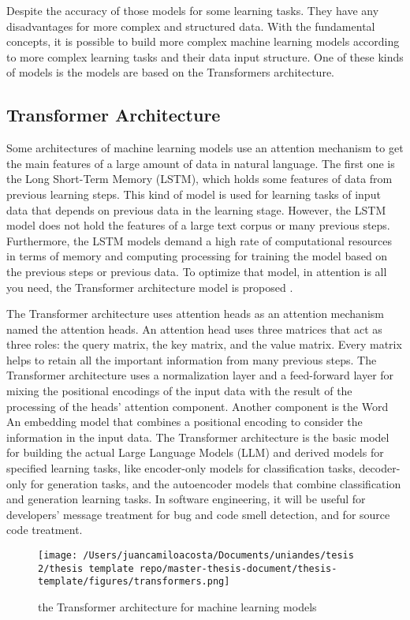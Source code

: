 Despite the accuracy of those models for some learning tasks. They have any disadvantages for more complex and structured data. With the fundamental concepts, it is possible to build more complex machine learning models according to more complex learning tasks and their data input structure. One of these kinds of models is the models are based on the Transformers architecture.

\subsection{Transformer Architecture}
Some architectures of machine learning models use an attention mechanism to get the main features of a large amount of data in natural language. The first one is the Long Short-Term Memory (LSTM), which holds some features of data from previous learning steps. This kind of model is used for learning tasks of input data that depends on previous data in the learning stage. However, the LSTM model does not hold the features of a large text corpus or many previous steps. Furthermore, the LSTM models demand a high rate of computational resources in terms of memory and computing processing for training the model based on the previous steps or previous data. To optimize that model, in attention is all you need, the Transformer architecture model is proposed \cite{attention_is_all_you_need}.

The Transformer architecture uses attention heads as an attention mechanism named the attention heads. An attention head uses three matrices that act as three roles: the query matrix, the key matrix, and the value matrix. Every matrix helps to retain all the important information from many previous steps. The Transformer architecture uses a normalization layer and a feed-forward layer for mixing the positional encodings of the input data with the result of the processing of the heads' attention component. Another component is the Word 
An embedding model that combines a positional encoding to consider the information in the input data.
The Transformer architecture is the basic model for building the actual Large Language Models (LLM) and derived models for specified learning tasks, like encoder-only models for classification tasks, decoder-only for generation tasks, and the autoencoder models that combine classification and generation learning tasks.
In software engineering, it will be useful for developers' message treatment for bug and code smell detection, and for source code treatment.

    \begin{figure}[H]
    \centering
    \texttt{[image: /Users/juancamiloacosta/Documents/uniandes/tesis 2/thesis template repo/master-thesis-document/thesis-template/figures/transformers.png]}
    \caption{the Transformer architecture for machine learning models \citet{attention_is_all_you_need} }
    \label{fig:word-embedding}
    \end{figure}

   






